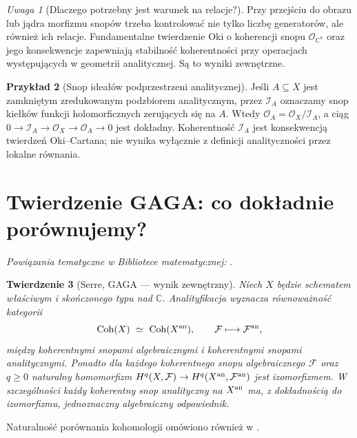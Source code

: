 \documentclass[11pt,a4paper,openany]{report}
\numberwithin{equation}{section}
\theoremstyle{plain}
\newtheorem{twierdzenie}{Twierdzenie}[section]
\theoremstyle{definition}
\newtheorem{przyklad}[twierdzenie]{Przykład}
\theoremstyle{remark}
\newtheorem{uwaga}[twierdzenie]{Uwaga}
\newcommand{\C}{\mathbb C}
\begin{document}
\begin{uwaga}[Dlaczego potrzebny jest warunek na relacje?]
Przy przejściu do obrazu lub jądra morfizmu snopów trzeba
kontrolować nie tylko liczbę generatorów, ale również ich
relacje. Fundamentalne twierdzenie Oki o koherencji snopu
$\mathcal O_{\C^n}$ oraz jego konsekwencje zapewniają
stabilność koherentności przy operacjach występujących
w geometrii analitycznej. Są to wyniki zewnętrzne.
\end{uwaga}

\begin{przyklad}[Snop ideałów podprzestrzeni analitycznej]
Jeśli $A\subseteq X$ jest zamkniętym zredukowanym
podzbiorem analitycznym, przez $\mathcal I_A$ oznaczamy
snop kiełków funkcji holomorficznych zerujących się na $A$.
Wtedy $\mathcal O_A=\mathcal O_X/\mathcal I_A$,
a ciąg
$0\to\mathcal I_A\to\mathcal O_X\to\mathcal O_A\to0$
jest dokładny. Koherentność $\mathcal I_A$ jest
konsekwencją twierdzeń Oki--Cartana; nie wynika wyłącznie
z definicji analityczności przez lokalne równania.
\end{przyklad}

\section{Twierdzenie GAGA: co dokładnie porównujemy?}
\label{sec:ga9-gaga}

\noindent\emph{Powiązania tematyczne w Bibliotece matematycznej:} .


\begin{twierdzenie}[Serre, GAGA — wynik zewnętrzny]
\label{tw:ga9-gaga}
Niech $X$ będzie schematem właściwym i skończonego typu nad $\C$.
Analityfikacja wyznacza równoważność kategorii
\[
 \operatorname{Coh}(X)\ \simeq\ \operatorname{Coh}(X^{\rm an}),
 \qquad \mathcal F\longmapsto\mathcal F^{\rm an},
\]
między koherentnymi snopami algebraicznymi i koherentnymi
snopami analitycznymi. Ponadto dla każdego koherentnego
snopu algebraicznego $\mathcal F$ oraz $q\ge0$ naturalny
homomorfizm
$H^q(X,\mathcal F)\to H^q(X^{\rm an},\mathcal F^{\rm an})$
jest izomorfizmem. W szczególności każdy koherentny
snop analityczny na $X^{\rm an}$ ma, z dokładnością do
izomorfizmu, jednoznaczny algebraiczny odpowiednik.
\end{twierdzenie}

Naturalność porównania kohomologii omówiono również w .
\end{document}
